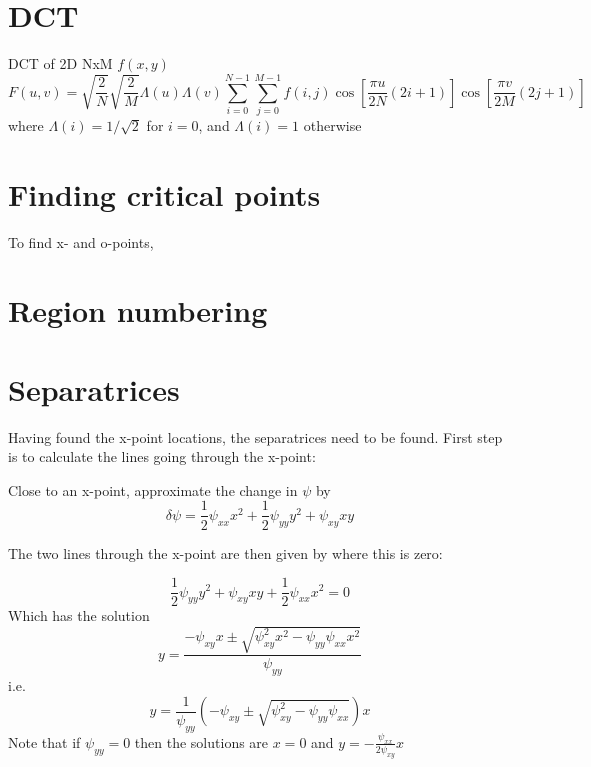 \documentclass[12pt, a4paper]{article}
\begin{document}
\section{DCT}

DCT of 2D NxM $f\left(x,y\right)$
\[
F\left(u, v\right) = \sqrt{\frac{2}{N}}\sqrt{\frac{2}{M}}\Lambda\left(u\right)\Lambda\left(v\right)\sum_{i=0}^{N-1}\sum_{j=0}^{M-1} f\left(i, j\right) \cos\left[\frac{\pi u}{2N}\left(2i+1\right)\right]\cos\left[\frac{\pi v}{2M}\left(2j+1\right)\right]
\]
where $\Lambda\left(i\right) = 1/\sqrt{2}$ for $i=0$, and $\Lambda\left(i\right) = 1$ otherwise
 
\section{Finding critical points}

To find x- and o-points, 

\section{Region numbering}
\label{sec:numbering}


\section{Separatrices}

Having found the x-point locations, the separatrices need to be found.
First step is to calculate the lines going through the x-point:

Close to an x-point, approximate the change in $\psi$ by
\[
\delta\psi = \frac{1}{2}\psi_{xx} x^2 + \frac{1}{2}\psi_{yy}y^2 + \psi_{xy} xy
\]

The two lines through the x-point are then given by where this is zero:

\[
\frac{1}{2}\psi_{yy}y^2 + \psi_{xy}xy + \frac{1}{2}\psi_{xx} x^2 = 0
\]
Which has the solution
\[
y = \frac{ -\psi_{xy}x \pm \sqrt{\psi_{xy}^2x^2 - \psi_{yy}\psi_{xx}x^2}}{\psi_{yy}}
\]
i.e.
\[
y = \frac{1}{\psi_{yy}}\left(-\psi_{xy} \pm \sqrt{\psi_{xy}^2 - \psi_{yy}\psi_{xx}}\right)x
\]
Note that if $\psi_{yy} = 0$ then the solutions are $x = 0$ and $y = -\frac{\psi_{xx}}{2\psi_{xy}}x$
\end{document}
